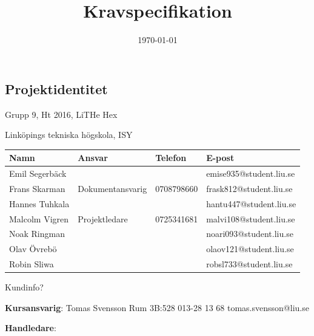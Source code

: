 \documentclass[a4paper,titlepage,12pt]{article}
\title{\textbf{Kravspecifikation}}
\date{\today}
\begin{document}
	\maketitle
	\newpage

	
	\begin{center}


		\section*{Projektidentitet}
		Grupp 9, Ht 2016, LiTHe Hex

		Linköpings tekniska högskola, ISY

		\begin{table}[h]
			\begin{tabular}[pos]{| l | l | l | l |}
				\hline
				\textbf{Namn} & \textbf{Ansvar} & \textbf{Telefon} & \textbf{E-post} \\ \hline
				Emil Segerbäck & & & emise935@student.liu.se \\ \hline
				Frans Skarman & Dokumentansvarig & 0708798660 & frask812@student.liu.se \\ \hline
				Hannes Tuhkala & & & hantu447@student.liu.se \\ \hline
				Malcolm Vigren & Projektledare & 0725341681 & malvi108@student.liu.se \\ \hline
				Noak Ringman &  &  & noari093@student.liu.se \\ \hline
				Olav Övrebö &  &  & olaov121@student.liu.se \\ \hline
				Robin Sliwa &  &  & robsl733@student.liu.se \\ \hline
			\end{tabular}
		\end{table}


		Kundinfo?

		\textbf{Kursansvarig}: Tomas Svensson Rum 3B:528 013-28 13 68 tomas.svensson@liu.se

		\textbf{Handledare}:


		
		\newpage




\end{center}
\end{document}
